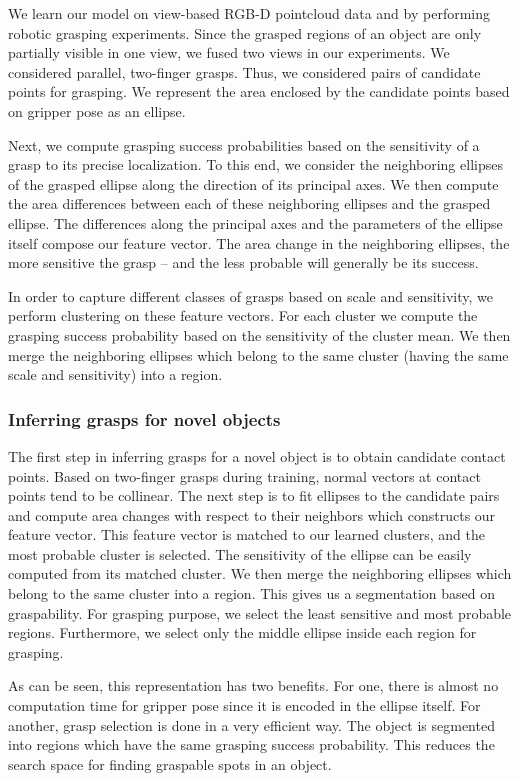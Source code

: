 \documentclass[a4paper,11pt,pdf]{pacmanreport}
\begin{document}
We learn our model on view-based RGB-D pointcloud data and by
performing robotic grasping experiments. Since the grasped regions of
an object are only partially visible in one view, we fused two views
in our experiments. We considered parallel, two-finger grasps. Thus,
we considered pairs of candidate points for grasping. We represent the
area enclosed by the candidate points based on gripper pose as an
ellipse.

Next, we compute grasping success probabilities based on the
sensitivity of a grasp to its precise localization. To this end, we
consider the neighboring ellipses of the grasped ellipse along the
direction of its principal axes. We then compute the area differences
between each of these neighboring ellipses and the grasped
ellipse. The differences along the principal axes and the parameters
of the ellipse itself compose our feature vector. The area change
in the neighboring ellipses, the more sensitive the grasp -- and the
less probable will generally be its success.

In order to capture different classes of grasps based on scale and
sensitivity, we perform clustering on these feature vectors. For each
cluster we compute the grasping success probability based on the
sensitivity of the cluster mean. We then merge the neighboring
ellipses which belong to the same cluster (having the same scale and
sensitivity) into a region.

\subsubsection{Inferring grasps for novel objects}
 
The first step in inferring grasps for a novel object is to obtain
candidate contact points. Based on two-finger
grasps during training, normal vectors at contact points tend to be
collinear. The next step is to fit ellipses to the candidate pairs and
compute area changes with respect to their neighbors which constructs
our feature vector. This feature vector is matched to our learned
clusters, and the most probable cluster is selected. The sensitivity
of the ellipse can be easily computed from its matched cluster. We
then merge the neighboring ellipses which belong to the same cluster
into a region. This gives us a segmentation based on graspability.
For grasping purpose, we select the least sensitive and most probable
regions. Furthermore, we select only the middle ellipse inside each
region for grasping.

As can be seen, this representation has two benefits. For one, there
is almost no computation time for gripper pose since it is encoded in
the ellipse itself. For another, grasp selection is done in a very
efficient way. The object is segmented into regions which have the
same grasping success probability. This reduces the search space for
finding graspable spots in an object.
\end{document}
